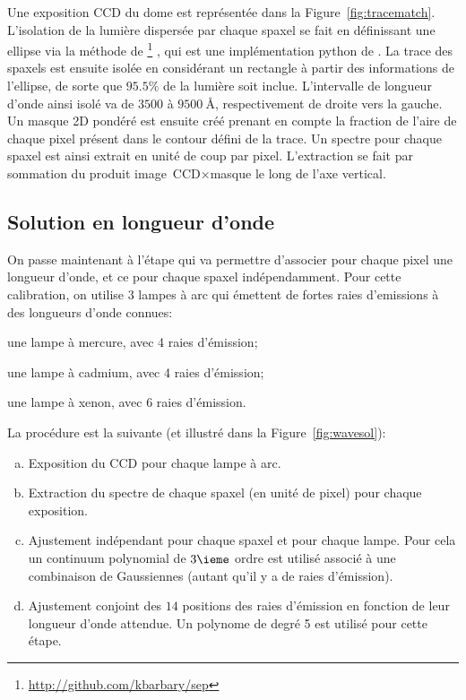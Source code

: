 \documentclass[../main/main.tex]{subfiles}
\begin{document}
Une exposition CCD du dome est représentée dans la
Figure~\ref{fig:tracematch}. L'isolation de la lumière dispersée par
chaque spaxel se fait en définissant une ellipse
via la méthode  de
\footnote{\url{http://github.com/kbarbary/sep}}
\citep{Barbary2016Sep}, qui est une implémentation python de 
\citep{Bertinsextractor}. La trace des spaxels est ensuite isolée en
considérant un rectangle à partir des informations de l'ellipse, de
sorte que $95.5\%$ de la lumière soit inclue. L'intervalle de
longueur d'onde ainsi isolé va de $3500$ à $\SI{9500}{\angstrom}$,
respectivement de droite vers la gauche. Un masque 2D pondéré est
ensuite créé prenant en compte la fraction de l'aire de chaque pixel
présent dans le contour défini de la trace. Un spectre pour chaque
spaxel est ainsi extrait en unité de coup par
pixel. L'extraction se fait par sommation du produit \mbox{\og image CCD$\times$masque\fg{}} le long de l'axe vertical.

\subsection{Solution en longueur d'onde}\label{ssec:wavesol}
On passe maintenant à l'étape qui va permettre d'associer pour chaque pixel une
longueur d'onde, et ce pour chaque spaxel indépendamment.
Pour cette calibration, on utilise 3 lampes à arc qui émettent de fortes
raies d'emissions à des longueurs d'onde connues:

\begin{description}[itemsep=0em]
\item[Hg] une lampe à mercure, avec 4 raies d'émission;
\item[Cd] une lampe à cadmium, avec 4 raies d'émission;
\item[Xe] une lampe à xenon, avec 6 raies d'émission.
\end{description}

La procédure est la suivante (et illustré dans la Figure~\ref{fig:wavesol}):
\begin{enumerate}[(a)]
\item Exposition du CCD pour chaque lampe à arc.
\item Extraction du spectre de chaque spaxel (en unité de pixel) pour chaque exposition.
\item Ajustement indépendant pour chaque spaxel et pour chaque
  lampe. Pour cela un continuum polynomial de $3\ieme$ ordre est
  utilisé associé à une combinaison de Gaussiennes (autant qu'il y a de
  raies d'émission).
\item Ajustement conjoint des $14$ positions des raies d'émission en fonction de
  leur longueur d'onde attendue. Un polynome de degré 5 est utilisé pour
  cette étape.
\end{enumerate}
\end{document}

